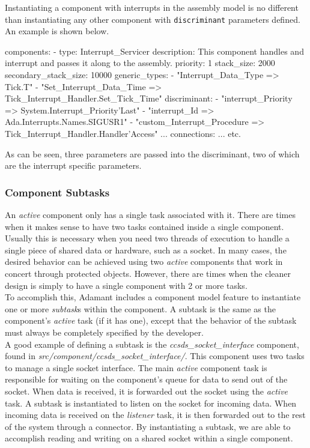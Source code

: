 Instantiating a component with interrupts in the assembly model is no different than instantiating any other component with \texttt{discriminant} parameters defined. An example is shown below.

\vspace{5mm} %
\begin{yamlcode}
components:
  - type: Interrupt_Servicer
    description: This component handles and interrupt and passes it along to the assembly.
    priority: 1
    stack_size: 2000
    secondary_stack_size: 10000
    generic_types:
      - "Interrupt_Data_Type => Tick.T"
      - "Set_Interrupt_Data_Time => Tick_Interrupt_Handler.Set_Tick_Time"
    discriminant:
      - "interrupt_Priority => System.Interrupt_Priority'Last"
      - "interrupt_Id => Ada.Interrupts.Names.SIGUSR1"
      - "custom_Interrupt_Procedure => Tick_Interrupt_Handler.Handler'Access"
  ... 
connections: 
  ...
  etc.
\end{yamlcode}
\vspace{5mm} %

As can be seen, three parameters are passed into the discriminant, two of which are the interrupt specific parameters.

\subsubsection{Component Subtasks}
 
An \textit{active} component only has a single task associated with it. There are times when it makes sense to have two tasks contained inside a single component. Usually this is necessary when you need two threads of execution to handle a single piece of shared data or hardware, such as a socket. In many cases, the desired behavior can be achieved using two \textit{active} components that work in concert through protected objects. However, there are times when the cleaner design is simply to have a single component with 2 or more tasks. \\

To accomplish this, Adamant includes a component model feature to instantiate one or more \textit{subtask}s within the component. A subtask is the same as the component's \textit{active} task (if it has one), except that the behavior of the subtask must always be completely specified by the developer. \\

A good example of defining a subtask is the \textit{ccsds\_socket\_interface} component, found in \textit{src/component/ccsds\_socket\_interface/}. This component uses two tasks to manage a single socket interface. The main \textit{active} component task is responsible for waiting on the component's queue for data to send out of the socket. When data is received, it is forwarded out the socket using the \textit{active} task. A subtask is instantiated to listen on the socket for incoming data. When incoming data is received on the \textit{listener} task, it is then forwarded out to the rest of the system through a connector. By instantiating a subtask, we are able to accomplish reading and writing on a shared socket within a single component. \\

